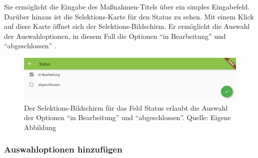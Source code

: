 Sie ermöglicht die Eingabe des Maßnahmen-Titels über ein simples Eingabefeld. Darüber hinaus ist die Selektions-Karte für den Status zu sehen. Mit einem Klick auf diese Karte öffnet sich der Selektions-Bildschirm. Er ermöglicht die Auswahl der Auswahloptionen, in diesem Fall die Optionen \enquote{in Bearbeitung} und \enquote{abgeschlossen}
\Abb{\ref{fig:Schritt1SelektionsBildschirmStatus}}.

\begin{figure}[H]
  \centering
  \includegraphics[width=1.0\textwidth]{Inhalt/Hauptteil/Implementierung/Schritt-1/Status Auswahl.png}
  \caption[Schritt 1 Selektions-Bildschirm für Status]{Der Selektions-Bildschirm für das Feld Status erlaubt die Auswahl der Optionen \enquote{in Bearbeitung} und \enquote{abgeschlossen}. Quelle: Eigene Abbildung}
  \label{fig:Schritt1SelektionsBildschirmStatus}
\end{figure}


\subsubsection{Auswahloptionen hinzufügen}

